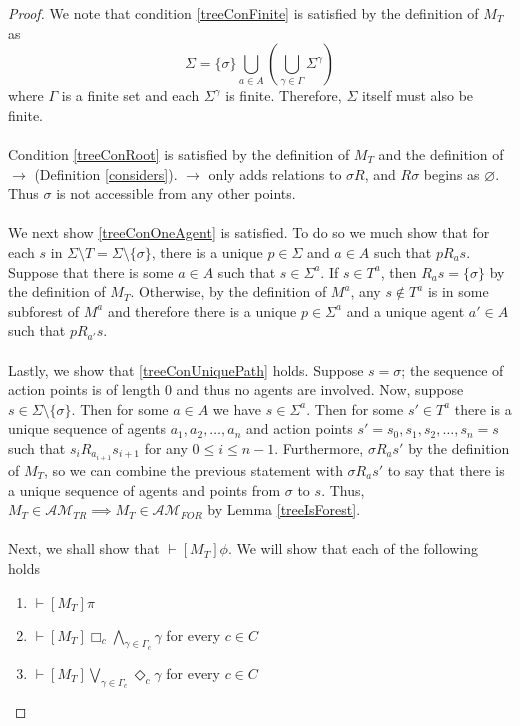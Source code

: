 \documentclass[12pt, a4paper, titlepage]{article}
\numberwithin{equation}{section}
\newcommand{\sqex}[1]{[{#1}]}
\newcommand{\eventClass}{\mathcal{AM}}
\newcommand{\treeClass}{\eventClass_{TR}}
\newcommand{\forestClass}{\eventClass_{FOR}}
\begin{document}
\begin{proof}
We note that condition \ref{treeConFinite} is satisfied by the definition of $M_T$ as
\[
  \Sigma = \{\sigma\} \bigcup_{a \in A} (\bigcup_{\gamma \in \Gamma}
      \Sigma^{\gamma})
\]
where $\Gamma$ is a finite set and each $\Sigma^\gamma$ is finite.
Therefore, $\Sigma$ itself must also be finite.\\
\\
Condition \ref{treeConRoot} is satisfied by the definition of $M_T$ and the definition of $\to$
(Definition \ref{considers}).
$\to$ only adds relations to $\sigma R$, and $R \sigma$ begins as $\varnothing$.
Thus $\sigma$ is not accessible from any other points.\\
\\
We next show \ref{treeConOneAgent} is satisfied.
To do so we much show that for each $s$ in $\Sigma \setminus T = \Sigma \setminus \{ \sigma \}$, there
is a unique $p \in \Sigma$ and $a \in A$ such that $p R_a s$.
Suppose that there is some $a \in A$ such that $s \in \Sigma^a$.
If $s \in T^a$, then $R_a s = \{ \sigma \}$ by the definition of $M_T$.
Otherwise, by the definition of $M^a$, any $s \notin T^a$ is in some subforest of $M^a$
and therefore there is a unique $p \in \Sigma^a$ and a unique agent $a' \in A$ such that $p R_{a'}
s$.\\
\\
Lastly, we show that \ref{treeConUniquePath} holds.
Suppose $s = \sigma$; the sequence of action points is of length 0 and thus no agents are involved.
Now, suppose $s \in \Sigma \setminus \{ \sigma \}$.
Then for some $a \in A$ we have $s \in \Sigma^a$.
Then for some $s' \in T^a$ there is a unique sequence of agents $a_1, a_2, \ldots, a_n$ and action
points $s' = s_0, s_1, s_2, \ldots, s_n = s$ such that $s_i R_{a_{i+1}} s_{i+1}$ for any $0 \leq i
\leq n-1$.
Furthermore, $\sigma R_a s'$ by the definition of $M_T$, so we can combine the previous statement
with $\sigma R_a s'$ to say that there is a unique sequence of agents and points from $\sigma$ to
$s$.
Thus, $M_T \in \treeClass \implies M_T \in \forestClass$ by Lemma \ref{treeIsForest}.\\
\\
Next, we shall show that $\vdash \sqex{M_T} \phi$.
We will show that each of the following holds
\begin{enumerate}
	\item $\vdash \sqex{M_T} \pi$
	\item $\vdash \sqex{M_T} \Box_c \bigwedge_{\gamma \in \Gamma_c} \gamma$ for every $c \in C$
	\item $\vdash \sqex{M_T} \bigvee_{\gamma \in \Gamma_c} \Diamond_c \gamma$ for every $c \in C$
\end{enumerate}


\end{proof}
\end{document}
